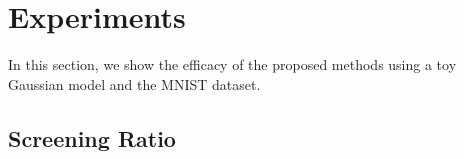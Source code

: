 \section{Experiments}
In this section, we show the efficacy of the proposed methods using a toy Gaussian model and the MNIST dataset.
\subsection{Screening Ratio}